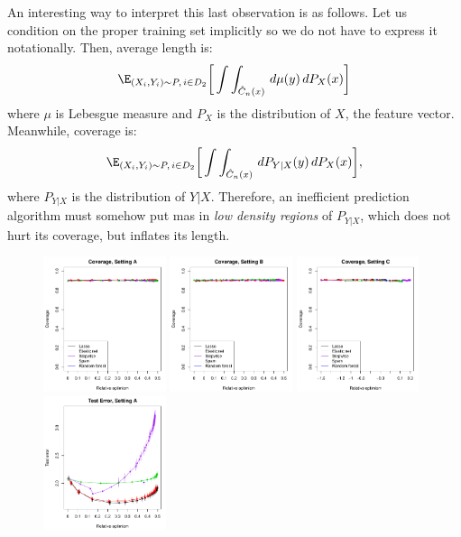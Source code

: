 \documentclass{article}
\begin{document}
An interesting way to interpret this last observation is as follows. Let us
condition on the proper training set implicitly so we do not have to express it
notationally. Then, average length is:       
\[
\E_{(X_i,Y_i) \sim P, \, i \in D_2} \bigg[ \int \int_{\hC_n(x)} \, d\mu(y) \,
dP_X(x) \bigg]  
\]
where $\mu$ is Lebesgue measure and $P_X$ is the distribution of $X$, the
feature vector. Meanwhile, coverage is: 
\[
\E_{(X_i,Y_i) \sim P, \, i \in D_2} \bigg[ \int \int_{\hC_n(x)} \, dP_{Y|X}(y)
\, dP_X(x) \bigg],  
\]
where $P_{Y|X}$ is the distribution of $Y|X$. Therefore, an inefficient
prediction algorithm must somehow put mas in \emph{low density regions} of 
$P_{Y|X}$, which does not hurt its coverage, but inflates its length.   

\begin{figure}[p]
\centering
\includegraphics[width=0.32\textwidth]{fig_sim/A_cov.pdf}
\includegraphics[width=0.32\textwidth]{fig_sim/B_cov.pdf}
\includegraphics[width=0.32\textwidth]{fig_sim/C_cov.pdf} \\
\includegraphics[width=0.32\textwidth]{fig_sim/A_err.pdf}

\end{figure}
\end{document}
